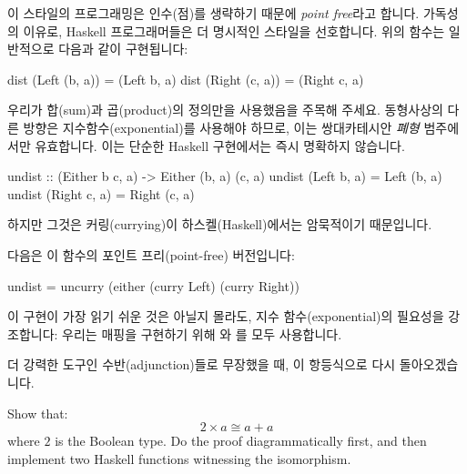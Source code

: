 \documentclass[DaoFP]{subfiles}
\begin{document}
이 스타일의 프로그래밍은 인수(점)를 생략하기 때문에 \emph{point free}라고 합니다. 가독성의 이유로, Haskell 프로그래머들은 더 명시적인 스타일을 선호합니다. 위의 함수는 일반적으로 다음과 같이 구현됩니다:
\begin{haskell}
dist (Left  (b, a)) = (Left  b, a)
dist (Right (c, a)) = (Right c, a)
\end{haskell}

우리가 합(sum)과 곱(product)의 정의만을 사용했음을 주목해 주세요. 동형사상의 다른 방향은 지수함수(exponential)를 사용해야 하므로, 이는 쌍대카테시안 \emph{폐형} 범주에서만 유효합니다. 이는 단순한 Haskell 구현에서는 즉시 명확하지 않습니다.
\begin{haskell}
undist :: (Either b c, a) -> Either (b, a) (c, a)
undist (Left b, a)  = Left (b, a)
undist (Right c, a) = Right (c, a)
\end{haskell}
하지만 그것은 커링(currying)이 하스켈(Haskell)에서는 암묵적이기 때문입니다.

다음은 이 함수의 포인트 프리(point-free) 버전입니다:
\begin{haskell}
undist = uncurry (either (curry Left) (curry Right))
\end{haskell}
이 구현이 가장 읽기 쉬운 것은 아닐지 몰라도, 지수 함수(exponential)의 필요성을 강조합니다: 우리는 매핑을 구현하기 위해 와 를 모두 사용합니다.

더 강력한 도구인 수반(adjunction)들로 무장했을 때, 이 항등식으로 다시 돌아오겠습니다.

\begin{exercise}
Show that:
\[ 2 \times a \cong a + a \]
where $2$ is the Boolean type. Do the proof diagrammatically first, and then implement two Haskell functions witnessing the isomorphism.
\end{exercise}
\end{document}
